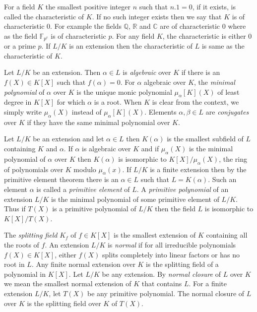 \documentclass[11pt]{madras}%
\theoremstyle{remark}
\newcommand{\nomclfields}[3][]{{\nomenclature[r#1]{#2}{#3}}}
\begin{document}
For a field $K$ the smallest positive integer $n$ such that $n.1 = 0$,
if it exists, is called the characteristic of $K$. If no such integer
exists then we say that $K$ is of characteristic $0$.  For example the
fields $\mathbb{Q}$, $\mathbb{R}$ and $\mathbb{C}$ are of
characteristic $0$ where as the field $\mathbb{F}_{p^r}$ is of
characteristic $p$. For any field $K$, the characteristic is either
$0$ or a prime $p$. If $L/K$ is an extension then the characteristic
of $L$ is same as the characteristic of $K$.

Let $L/K$ be an extension. Then $\alpha \in L$ is
\emph{algebraic} over $K$ if there is an $f(X)\in
K[X]$ such that $f(\alpha)=0$. For $\alpha$ algebraic over $K$, the
\emph{minimal polynomial} of $\alpha$ over
$K$ is the unique monic polynomial $\mu_\alpha[K](X)$ of least degree
in $K[X]$ for which $\alpha$ is a root. When $K$ is clear from the
context, we simply write $\mu_\alpha(X)$ instead of
$\mu_\alpha[K](X)$. Elements $\alpha,\beta\in L$ are
\emph{conjugates} over $K$ if they have the same
minimal polynomial over $K$.

Let $L/K$ be an extension and let $\alpha \in L$ then $K(\alpha)$ is
the smallest subfield of $L$ containing $K$ and $\alpha$. If $\alpha$
is algebraic over $K$ and if $\mu_\alpha(X)$ is the minimal polynomial
of $\alpha$ over $K$ then $K(\alpha)$ is isomorphic to
$K[X]/\mu_\alpha(X)$, the ring of polynomials over $K$ modulo
$\mu_\alpha(x)$. If $L/K$ is a finite extension then by the primitive
element theorem \cite[Theorem 4.6, Chapter V]{lang:algebra} there is
an $\alpha\in L$ such that $L=K(\alpha)$. Such an element $\alpha$ is
called a \emph{primitive element} of $L$. A
\emph{primitive polynomial} of an
extension $L/K$ is the minimal polynomial of some primitive element of
$L/K$. Thus if $T(X)$ is a primitive polynomial of $L/K$ then the
field $L$ is isomorphic to $K[X]/T(X)$.

The \emph{splitting field} $K_f$ of $f\in K[X]$
is the smallest extension of $K$ containing all the roots of $f$.  An
extension $L/K$ is \emph{normal} if
for all irreducible polynomials $f(X)\in K[X]$, either $f(X)$ splits
completely into linear factors or has no root in $L$. Any finite
normal extension over $K$ is the splitting field of a polynomial in
$K[X]$. Let $L/K$ be any extension.  By \emph{normal
  closure} of $L$ over $K$ we mean the smallest
normal extension of $K$ that contains $L$.  For a finite extension
$L/K$, let $T(X)$ be any primitive polynomial.  The normal closure of
$L$ over $K$ is the splitting field over $K$ of $T(X)$.
\nomclfields{$K_f$}{splitting field of the polynomial $f(X)$ over
  $K$\refpage}
\end{document}
